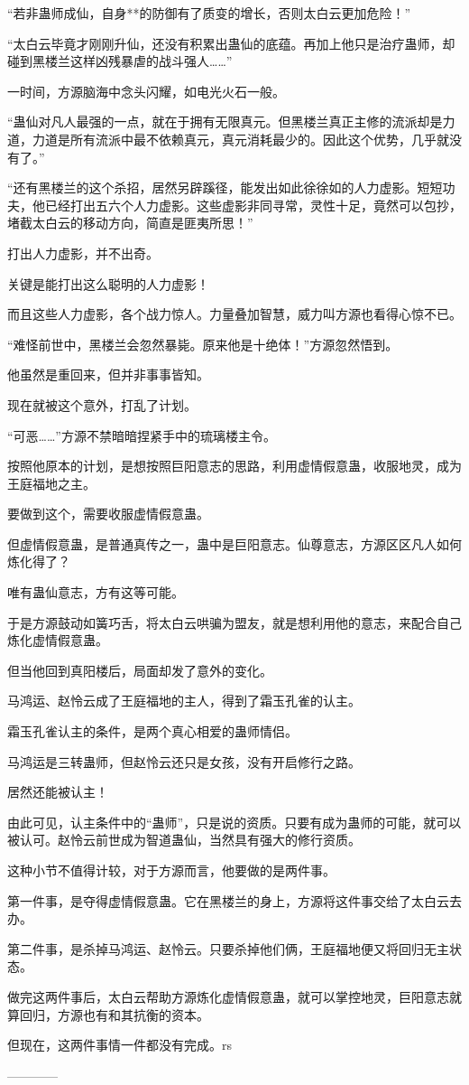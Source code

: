 \begin{this_body}
“若非蛊师成仙，自身**的防御有了质变的增长，否则太白云更加危险！”

“太白云毕竟才刚刚升仙，还没有积累出蛊仙的底蕴。再加上他只是治疗蛊师，却碰到黑楼兰这样凶残暴虐的战斗强人……”

一时间，方源脑海中念头闪耀，如电光火石一般。

“蛊仙对凡人最强的一点，就在于拥有无限真元。但黑楼兰真正主修的流派却是力道，力道是所有流派中最不依赖真元，真元消耗最少的。因此这个优势，几乎就没有了。”

“还有黑楼兰的这个杀招，居然另辟蹊径，能发出如此徐徐如的人力虚影。短短功夫，他已经打出五六个人力虚影。这些虚影非同寻常，灵性十足，竟然可以包抄，堵截太白云的移动方向，简直是匪夷所思！”

打出人力虚影，并不出奇。

关键是能打出这么聪明的人力虚影！

而且这些人力虚影，各个战力惊人。力量叠加智慧，威力叫方源也看得心惊不已。

“难怪前世中，黑楼兰会忽然暴毙。原来他是十绝体！”方源忽然悟到。

他虽然是重回来，但并非事事皆知。

现在就被这个意外，打乱了计划。

“可恶……”方源不禁暗暗捏紧手中的琉璃楼主令。

按照他原本的计划，是想按照巨阳意志的思路，利用虚情假意蛊，收服地灵，成为王庭福地之主。

要做到这个，需要收服虚情假意蛊。

但虚情假意蛊，是普通真传之一，蛊中是巨阳意志。仙尊意志，方源区区凡人如何炼化得了？

唯有蛊仙意志，方有这等可能。

于是方源鼓动如簧巧舌，将太白云哄骗为盟友，就是想利用他的意志，来配合自己炼化虚情假意蛊。

但当他回到真阳楼后，局面却发了意外的变化。

马鸿运、赵怜云成了王庭福地的主人，得到了霜玉孔雀的认主。

霜玉孔雀认主的条件，是两个真心相爱的蛊师情侣。

马鸿运是三转蛊师，但赵怜云还只是女孩，没有开启修行之路。

居然还能被认主！

由此可见，认主条件中的“蛊师”，只是说的资质。只要有成为蛊师的可能，就可以被认可。赵怜云前世成为智道蛊仙，当然具有强大的修行资质。

这种小节不值得计较，对于方源而言，他要做的是两件事。

第一件事，是夺得虚情假意蛊。它在黑楼兰的身上，方源将这件事交给了太白云去办。

第二件事，是杀掉马鸿运、赵怜云。只要杀掉他们俩，王庭福地便又将回归无主状态。

做完这两件事后，太白云帮助方源炼化虚情假意蛊，就可以掌控地灵，巨阳意志就算回归，方源也有和其抗衡的资本。

但现在，这两件事情一件都没有完成。rs

------------

\end{this_body}

